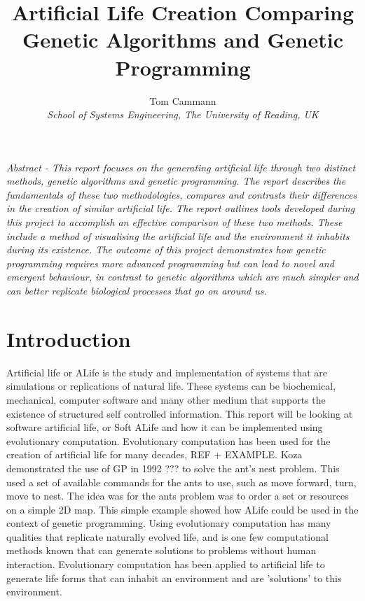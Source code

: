 \documentclass[12pt]{article}
\begin{document}
\title{\LARGE \bf Artificial Life Creation Comparing Genetic Algorithms and Genetic Programming\vspace{1cm}}
\author{\small Tom Cammann\\
\small \it{School of Systems Engineering, The University of Reading, UK}}
\date{}
\maketitle

\renewcommand{\abstractname}{}
\begin{onecolabstract}
\noindent \it Abstract - This report focuses on the generating artificial life through two distinct methods, genetic algorithms and genetic programming. The
report describes the fundamentals of these two methodologies, compares and contrasts their differences in the creation of similar 
artificial life. The report outlines tools developed during this project to accomplish an effective comparison of these two methods.
These include a method of visualising the artificial life and the environment it inhabits during its existence. The outcome of 
this project demonstrates how genetic programming requires more advanced programming but can lead to novel and emergent behaviour,
in contrast to genetic algorithms which are much simpler and can better replicate biological processes that go on around us. 
\end{onecolabstract}


\section{Introduction}

Artificial life or ALife is the study and implementation of systems that are simulations or replications of natural life.
These systems can be biochemical, mechanical, computer software and many other medium that supports the existence of structured self controlled information.
This report will be looking at software artificial life, or Soft ALife and how it can be implemented using evolutionary computation.
Evolutionary computation has been used for the creation of artificial life for many decades, REF + EXAMPLE. Koza demonstrated the use of GP in 1992 ??? to solve the ant's nest problem. This used a set
of available commands for the ants to use, such as move forward, turn, move to nest. The idea was for
the ants problem was to order a set or resources on a simple 2D map. This simple example showed how ALife could
be used in the context of genetic programming.
Using evolutionary computation has many qualities that replicate naturally evolved life, and is one few computational methods known that can generate solutions to problems without human interaction.
Evolutionary computation has been applied to artificial life to generate life forms that can inhabit an environment and are 'solutions' to this environment.
\end{document}
